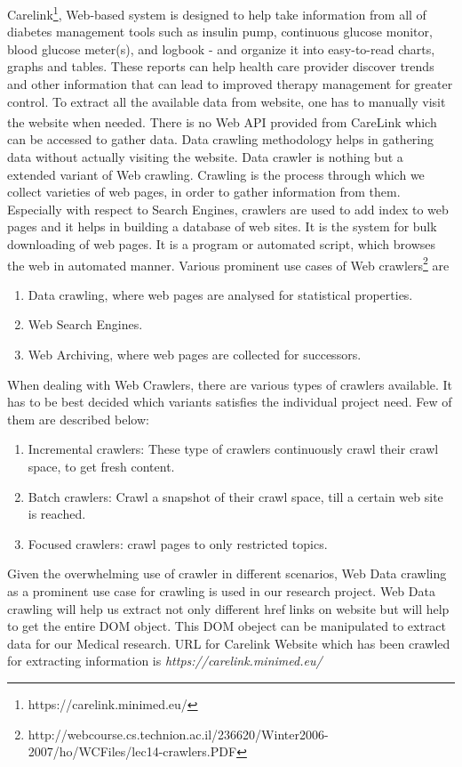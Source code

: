 \documentclass[article,type=msc,colorback,accentcolor=tud9c,twoside,11pt]{tudthesis}
\begin{document}
Carelink\footnote{https://carelink.minimed.eu/}, Web-based system is designed to help take information from all of diabetes management tools such as insulin pump, continuous glucose monitor, blood glucose meter(s), and logbook - and organize it into easy-to-read charts, graphs and tables. These reports can help health care provider discover trends and other information that can lead to improved therapy management for greater control. To extract all the available data from website, one has to manually visit the website when needed. There is no Web API provided from CareLink\textsuperscript{\textregistered} which can be accessed to gather data. Data crawling methodology helps in gathering data without actually visiting the website. Data crawler is nothing but a extended variant of Web crawling. Crawling is the process through which we collect varieties of web pages, in order to gather information from them. Especially with respect to Search Engines, crawlers are used to add index to web pages and it helps in building a database of web sites. It is the system for bulk downloading of web pages. It is a program or automated script, which browses the web in automated manner. Various prominent use cases of Web crawlers\footnote{http://webcourse.cs.technion.ac.il/236620/Winter2006-2007/ho/WCFiles/lec14-crawlers.PDF} are
\begin{enumerate}
\item	Data crawling, where web pages are analysed for statistical properties.
\item	Web Search Engines.
\item	Web Archiving, where web pages are collected for successors.
\end{enumerate}
When dealing with Web Crawlers, there are various types of crawlers available. It has to be best decided which variants satisfies the individual project need. Few of them are described below:
\begin{enumerate}
\item	Incremental crawlers: These type of crawlers continuously crawl their crawl space, to get fresh content.
\item	Batch crawlers: Crawl a snapshot of their crawl space, till a certain web site is reached.
\item	Focused crawlers: crawl pages to only restricted topics.
\end{enumerate}
Given the overwhelming use of crawler in different scenarios, Web Data crawling as a prominent use case for crawling is used in our research project. Web Data crawling will help us extract not only different href links on website but will help to get the entire DOM object. This DOM obeject can be manipulated to extract data for our Medical research. URL for Carelink Website which has been crawled for extracting information is \textit{https://carelink.minimed.eu/}
\end{document}
